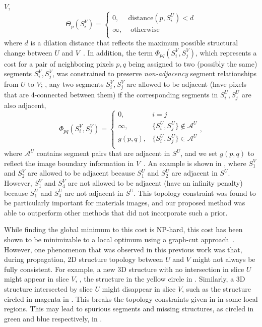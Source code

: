 \documentclass[]{spie}  %
\begin{document}
$V$,
\begin{equation}
  \Theta_p(S^{V}_i) = \left\{
    \begin{array}{lcr}
      0, &  \textrm{distance}(p,S^U_i) < d  \\
      \infty, & \textrm{ otherwise} \\
    \end{array}
  \right.
  \label{eq:theta}
\end{equation}
where $d$ is a dilation distance that reflects the maximum possible
structural change between $U$ and $V$~\cite{waggoner:11}.  In
addition, the \smooth{} term $\Phi_{pq}(S_i^V , S_j^V)$, which
represents a cost for a pair of neighboring pixels $p,q$ being
assigned to two (possibly the same) segments $S^V_i, S^V_j$, was
constrained to preserve \emph{non-adjacency} segment relationships
from $U$ to $V$; \ie, any two segments $S^V_i, S^V_j$ are allowed to
be adjacent (have pixels that are 4-connected between them) if the
corresponding segments in $S^U_i, S^U_j$ are also adjacent,
\begin{equation} \Phi_{pq}(S^V_i , S^V_j) = \left\{
    \begin{array}{lcr}
      0, & i = j \\
      \infty, & \{ S^U_i, S^U_j \} \notin \mathcal{A}^U  \\
      g( p, q ), & \{ S^U_i, S^U_j \} \in \mathcal{A}^U \\
    \end{array}
  \right. ,
  \label{eq:phi}
\end{equation}
where $\mathcal{A}^U$ contains segment pairs that are adjacent in
$S^U$, and we set $g(p,q)$ to reflect the image boundary information
in $V$~\cite{waggoner:11}.  An example is shown in ,
where $S^V_1$ and $S^V_2$ are allowed to be adjacent because $S^U_1$
and $S^U_2$ are adjacent in $S^U$.  However, $S^V_1$ and $S^V_4$ are
not allowed to be adjacent (have an infinity penalty) because $S^U_1$
and $S^U_4$ are not adjacent in $S^U$.  This topology constraint was
found to be particularly important for materials images, and our
proposed method was able to outperform other methods that did not
incorporate such a prior.

While finding the global minimum to this cost is NP-hard, this cost
has been shown to be minimizable to a local optimum using a graph-cut
approach~\cite{veksler:99, boykov:01}.  However, one phenomenon that
was observed in this previous work was that, during propagation, 2D
structure topology between $U$ and $V$ might not always be fully
consistent.  For example, a new 3D structure with no intersection in
slice $U$ might appear in slice $V$, \eg, the structure in the yellow
circle in .  Similarly, a 3D structure intersected by
slice $U$ might disappear in slice $V$, such as the structure circled
in magenta in .  This breaks the topology constraints
given in  in some local regions.  This may lead to spurious
segments and missing structures, as circled in green and blue
respectively, in .  
\end{document}
